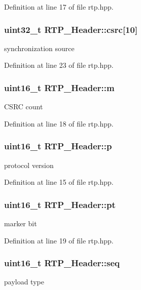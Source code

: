 Definition at line 17 of file rtp.hpp.

\hypertarget{struct_r_t_p___header_acdfaa8f4452ef3bf02041d4b2f79ef45}{
\subsubsection[{csrc}]{\setlength{\rightskip}{0pt plus 5cm}uint32\_\-t {\bf RTP\_\-Header::csrc}\mbox{[}10\mbox{]}}}
\label{struct_r_t_p___header_acdfaa8f4452ef3bf02041d4b2f79ef45}
synchronization source 

Definition at line 23 of file rtp.hpp.

\hypertarget{struct_r_t_p___header_a8ced1d32ad111aac77f73d3b671ec0c7}{
\subsubsection[{m}]{\setlength{\rightskip}{0pt plus 5cm}uint16\_\-t {\bf RTP\_\-Header::m}}}
\label{struct_r_t_p___header_a8ced1d32ad111aac77f73d3b671ec0c7}
CSRC count 

Definition at line 18 of file rtp.hpp.

\hypertarget{struct_r_t_p___header_aeabffdd4140a4124c5bc789d8fe3f258}{
\subsubsection[{p}]{\setlength{\rightskip}{0pt plus 5cm}uint16\_\-t {\bf RTP\_\-Header::p}}}
\label{struct_r_t_p___header_aeabffdd4140a4124c5bc789d8fe3f258}
protocol version 

Definition at line 15 of file rtp.hpp.

\hypertarget{struct_r_t_p___header_a2a81495ae755559520d0cecf66f1a125}{
\subsubsection[{pt}]{\setlength{\rightskip}{0pt plus 5cm}uint16\_\-t {\bf RTP\_\-Header::pt}}}
\label{struct_r_t_p___header_a2a81495ae755559520d0cecf66f1a125}
marker bit 

Definition at line 19 of file rtp.hpp.

\hypertarget{struct_r_t_p___header_a9a43990de1ed2f04d711bf090360172d}{
\subsubsection[{seq}]{\setlength{\rightskip}{0pt plus 5cm}uint16\_\-t {\bf RTP\_\-Header::seq}}}
\label{struct_r_t_p___header_a9a43990de1ed2f04d711bf090360172d}
payload type 

